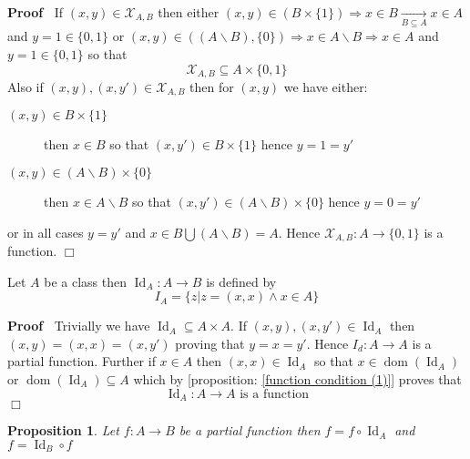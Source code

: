 \documentclass{book}
\newcommand{\Rightarrowlim}{\mathop{\rightarrow}\limits}
\newcommand{\tmop}[1]{\ensuremath{\operatorname{#1}}}
\newenvironment{proof}{\noindent\textbf{Proof\ }}{\hspace*{\fill}$\Box$\medskip}
\newtheorem{proposition}{Proposition}
{\theorembodyfont{\rmfamily}\newtheorem{remark}{Remark}}
\begin{document}
\begin{proof}
  If $(x, y) \in \mathcal{X}_{A, B}$ then either $(x, y) \in (B \times \{ 1
  \}) \Rightarrow x \in B \Rightarrowlim_{B \subseteq A} x \in A$ and $y = 1
  \in \{ 0, 1 \}$ or $(x, y) \in ((A\backslash B), \{ 0 \}) \Rightarrow x \in
  A\backslash B \Rightarrow x \in A$ and $y = 1 \in \{ 0, 1 \}$ so that
  \[ \mathcal{X}_{A, B} \subseteq A \times \{ 0, 1 \} \]
  Also if $ (x, y), (x, y') \in \mathcal{X}_{A, B}$ then for $(x, y)$ we have
  either:
  \begin{description}
    \item[$(x, y) \in B \times \{ 1 \}$] then $x \in B$ so that $(x, y') \in B
    \times \{ 1 \}$ hence $y = 1 = y'$
    
    \item[$(x, y) \in (A\backslash B) \times \{ 0 \}$] then $x \in A\backslash
    B$ so that $(x, y') \in (A\backslash B) \times \{ 0 \}$ hence $y = 0 = y'$
  \end{description}
  or in all cases $y = y'$ and $x \in B \bigcup (A\backslash B) = A$. Hence
  $\mathcal{X}_{A, B} : A \rightarrow \{ 0, 1 \}$ is a function.
\end{proof}

\begin{example}
  \label{function identity function}{}{\index{$\tmop{Id}_A$}}Let $A$ be a class then $\tmop{Id}_A : A
  \rightarrow B$ is defined by
  \[ I_A = \{ z | z = (x, x) \wedge x \in A \} \]
\end{example}

\begin{proof}
  Trivially we have $\tmop{Id}_A \subseteq A \times A$. If $(x, y), (x, y')
  \in \tmop{Id}_A$ then $(x, y) = (x, x) = (x, y')$ proving that $y = x = y'$.
  Hence $I_d : A \rightarrow A$ is a partial function. Further if $x \in A$
  then $(x, x) \in \tmop{Id}_A$ so that $x \in \tmop{dom} (\tmop{Id}_A)$ or
  $\tmop{dom} (\tmop{Id}_A) \subseteq A$ which by [proposition: \ref{function
  condition (1)}] proves that
  \[ \tmop{Id}_A : A \rightarrow A \text{ is a function} \]
\end{proof}

\begin{proposition}
  \label{function composition of Id function}Let $f : A \rightarrow B$ be a
  partial function then $f = f \circ \tmop{Id}_A$ and $f = \tmop{Id}_B \circ
  f$
\end{proposition}
\end{document}
